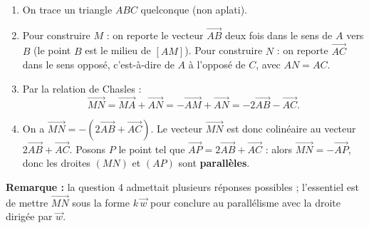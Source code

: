 \documentclass[11pt]{article}
\begin{document}
\begin{corrige}
\begin{enumerate}
\item On trace un triangle $ABC$ quelconque (non aplati).
\item Pour construire $M$ : on reporte le vecteur $\overrightarrow{AB}$ deux fois dans le sens de $A$ vers $B$ (le point $B$ est le milieu de $[AM]$). Pour construire $N$ : on reporte $\overrightarrow{AC}$ dans le sens opposé, c'est-à-dire de $A$ à l'opposé de $C$, avec $AN = AC$.
\item Par la relation de Chasles :
\[ \overrightarrow{MN} = \overrightarrow{MA} + \overrightarrow{AN} = -\overrightarrow{AM} + \overrightarrow{AN} = -2\overrightarrow{AB} - \overrightarrow{AC}. \]
\item On a $\overrightarrow{MN} = -\left(2\overrightarrow{AB} + \overrightarrow{AC}\right)$. Le vecteur $\overrightarrow{MN}$ est donc colinéaire au vecteur $2\overrightarrow{AB} + \overrightarrow{AC}$. Posons $P$ le point tel que $\overrightarrow{AP} = 2\overrightarrow{AB} + \overrightarrow{AC}$ : alors $\overrightarrow{MN} = -\overrightarrow{AP}$, donc les droites $(MN)$ et $(AP)$ sont \textbf{parallèles}.
\end{enumerate}
\textbf{Remarque :} la question 4 admettait plusieurs réponses possibles ; l'essentiel est de mettre $\overrightarrow{MN}$ sous la forme $k\,\vec{w}$ pour conclure au parallélisme avec la droite dirigée par $\vec{w}$.
\end{corrige}
\end{document}
